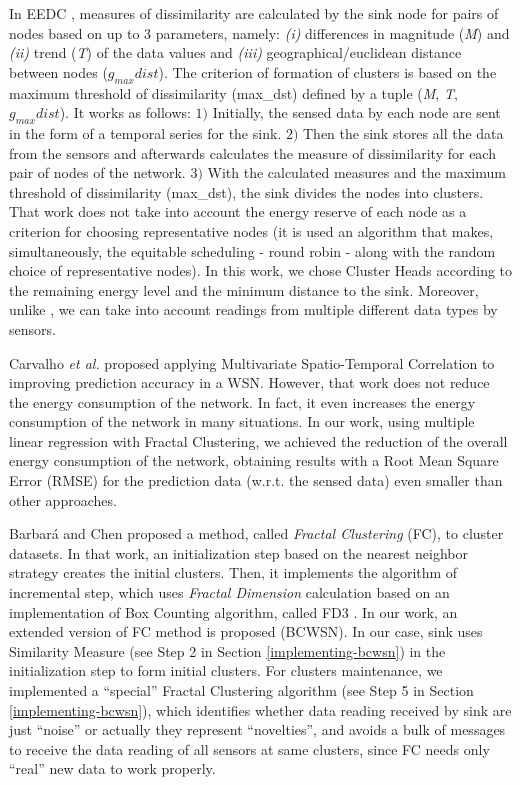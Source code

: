 \documentclass{acm_proc_article-sp}
\begin{document}
In EEDC \cite{Liu2007}, measures of dissimilarity are calculated by the sink
node for pairs of nodes based on up to $3$ parameters, namely: {\it (i)}
differences in magnitude (\textit{M}) and {\it (ii)} trend (\textit{T}) of the
data values and {\it (iii)} geographical/euclidean distance between nodes
($g_{max}dist$).
The criterion of formation of clusters is based on the maximum threshold of
dissimilarity (max\_dst) defined by a tuple (\textit{M}, \textit{T},
$g_{max}dist$). It works as follows: $1)$ Initially, the sensed data by each
node are sent in the form of a temporal series for the sink. $2)$ Then the sink
stores all the data from the sensors and afterwards calculates the measure of
dissimilarity for each pair of nodes of the network. $3)$
With the calculated measures and the maximum threshold of dissimilarity
(max\_dst), the sink divides the nodes into clusters.
That work does not take into account the energy reserve of each node as a
criterion for choosing representative nodes (it is used an algorithm that makes,
simultaneously, the equitable scheduling - round robin - along with the random
choice of representative nodes). In this work, we chose Cluster Heads according
to the remaining energy level and the minimum distance to the sink. Moreover,
unlike \cite{Liu2007}, we can take into account readings from multiple different
data types by sensors.
\vspace*{-.3cm}

Carvalho \textit{et al.} \cite{Carvalho2011} proposed applying Multivariate
Spatio-Temporal Correlation to improving prediction accuracy in a WSN. However,
that work does not reduce the energy consumption of the network. In fact, it
even increases the energy consumption of the network in many situations. In our
work, using multiple linear regression with Fractal Clustering, we achieved the
reduction of the overall energy consumption of the network, obtaining results
with a Root Mean Square Error (RMSE) for the prediction data (w.r.t. the sensed
data) even smaller than other approaches.
\vspace*{-.3cm}

Barbar\'{a} and Chen \cite{Barbara2000} proposed a method, called {\it Fractal
Clustering} (FC), to cluster datasets. In that work, an initialization step
based on the nearest neighbor strategy creates the initial clusters. Then, it
implements the algorithm of incremental step, which uses \textit{Fractal
Dimension} calculation based on an implementation of Box Counting algorithm,
called FD3 \cite{Liebovitch1989}. In our work, an extended version of FC method
is proposed (BCWSN). In our case, sink uses Similarity Measure (see Step 2 in
Section \ref{implementing-bcwsn}) in the initialization step to form initial
clusters. For clusters maintenance, we implemented a ``special'' Fractal
Clustering algorithm (see Step 5 in Section \ref{implementing-bcwsn}), which
identifies whether data reading received by sink are just ``noise'' or actually
they represent ``novelties'', and avoids a bulk of messages to receive the data
reading of all sensors at same clusters, since FC needs only ``real'' new data
to work properly.
\vspace*{-.3cm}
\end{document}
